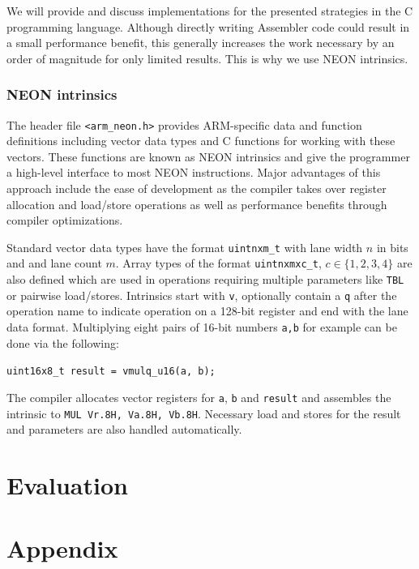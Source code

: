 \documentclass[12pt]{report}
\begin{document}
We will provide and discuss implementations for the presented strategies in the
C programming language. Although directly writing Assembler code could result
in a small performance benefit, this generally increases the work necessary by
an order of magnitude for only limited results. This is why we use NEON
intrinsics.

\subsection{NEON intrinsics}

The header file \texttt{<arm\_neon.h>} provides ARM-specific data and function
definitions including vector data types and C functions for working with these
vectors. These functions are known as NEON intrinsics and give the programmer a
high-level interface to most NEON instructions. Major advantages of this
approach include the ease of development as the compiler takes over register
allocation and load/store operations as well as performance benefits through
compiler optimizations.

Standard vector data types have the format \texttt{uintnxm\_t} with lane width
$n$ in bits and and lane count $m$. Array types of the format
\texttt{uintnxmxc\_t}, $c\in\{1,2,3,4\}$ are also defined which are used in
operations requiring multiple parameters like \texttt{TBL} or pairwise
load/stores. Intrinsics start with \texttt{v}, optionally contain a \texttt{q}
after the operation name to indicate operation on a 128-bit register and end
with the lane data format. Multiplying eight pairs of 16-bit numbers \texttt{a,b} for
example can be done via the following:

\begin{center}
    \texttt{uint16x8\_t result = vmulq\_u16(a, b);}
\end{center}

The compiler allocates vector registers for \texttt{a}, \texttt{b} and
\texttt{result} and assembles the intrinsic to \texttt{MUL Vr.8H, Va.8H,
Vb.8H}. Necessary load and stores for the result and parameters are also
handled automatically.

\chapter{Evaluation}

\chapter{Appendix}
\end{document}
